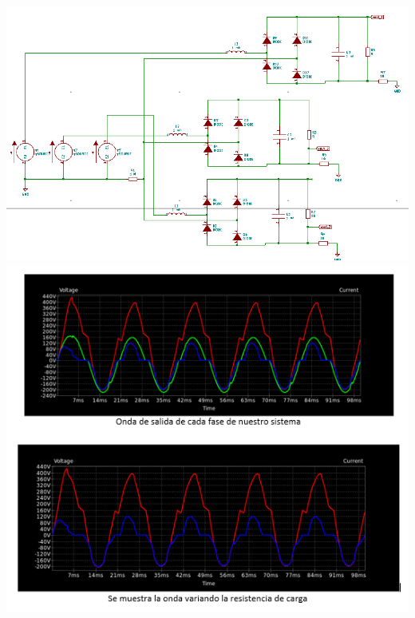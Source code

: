 \documentclass[12pt,a4paper]{article}
\begin{document}
\begin{flushleft}
\begin{center}
\includegraphics[scale=0.7]{imagenes/p5/Circuito4final.png} 
\includegraphics[scale=1]{imagenes/p5/simufinal.PNG} 
\end{center}
\end{flushleft}
\end{document}

